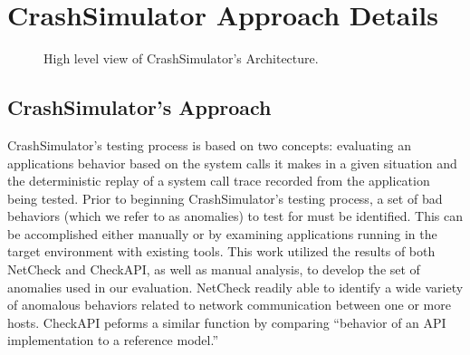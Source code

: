 \section{CrashSimulator Approach Details}
    \begin{figure}[t]
        \center{}
        \caption{High level view of CrashSimulator's Architecture.}
        \label{figure:architecture}
    \end{figure}

    \subsection{CrashSimulator's Approach}
    
    CrashSimulator's testing process is based on two concepts: evaluating an
    applications behavior based on the system calls it makes in a given
    situation and the deterministic replay of a system call trace recorded from
    the application being tested.  Prior to beginning CrashSimulator's testing
    process, a set of bad behaviors (which we refer to as anomalies) to test for
    must be identified.  This can be accomplished either manually or by
    examining applications running in the target environment with existing
    tools.  This work utilized the results of both NetCheck and CheckAPI, as
    well as manual analysis, to develop the set of anomalies used in our
    evaluation.  NetCheck readily able to identify a wide variety of anomalous
    behaviors related to network communication between one or more
    hosts. CheckAPI peforms a similar function by comparing ``behavior of an API
    implementation to a reference model.''

